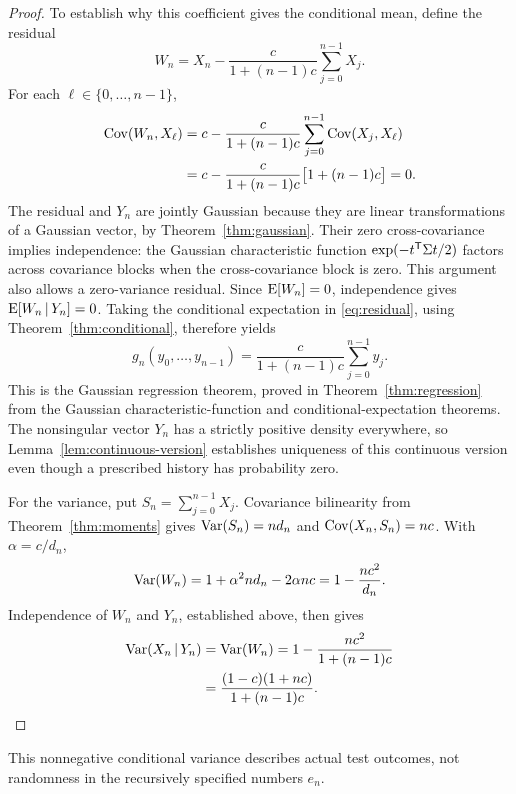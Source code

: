 \begin{proof}
To establish why this coefficient gives the conditional mean, define the
residual
\begin{equation}
  W_n=X_n-\frac{c}{1+(n-1)c}\sum_{j=0}^{n-1}X_j.
  \label{eq:residual}
\end{equation}
For each \(\ell\in\{0,\ldots,n-1\}\),
\begin{align*}
  \operatorname{Cov}(W_n,X_\ell)
  &=c-\frac{c}{1+(n-1)c}
         \sum_{j=0}^{n-1}\operatorname{Cov}(X_j,X_\ell)\\
  &=c-\frac{c}{1+(n-1)c}\bigl[1+(n-1)c\bigr]=0.
\end{align*}
The residual and \(Y_n\) are jointly Gaussian because they are linear
transformations of a Gaussian vector, by Theorem~\ref{thm:gaussian}.
Their zero cross-covariance implies
independence: the Gaussian characteristic function
\(\exp(-t^{\mathsf{T}}\Sigma t/2)\) factors across covariance blocks when the
cross-covariance block is zero. This argument also allows a zero-variance
residual. Since \(\operatorname{E}[W_n]=0\), independence gives
\(\operatorname{E}[W_n\,\vert\, Y_n]=0\). Taking the conditional expectation in
\eqref{eq:residual}, using Theorem~\ref{thm:conditional}, therefore yields
\begin{equation}
  \boxed{
    g_n(y_0,\ldots,y_{n-1})
    =\frac{c}{1+(n-1)c}\sum_{j=0}^{n-1}y_j.}
  \label{eq:conditional-mean}
\end{equation}
This is the Gaussian regression theorem, proved in
Theorem~\ref{thm:regression} from the Gaussian characteristic-function
and conditional-expectation theorems. The nonsingular vector \(Y_n\) has
a strictly positive density everywhere, so Lemma~\ref{lem:continuous-version}
establishes uniqueness of this continuous version even though a prescribed
history has probability zero.

For the variance, put \(S_n=\sum_{j=0}^{n-1}X_j\). Covariance bilinearity
from Theorem~\ref{thm:moments} gives
\(\operatorname{Var}(S_n)=nd_n\) and \(\operatorname{Cov}(X_n,S_n)=nc\). With \(\alpha=c/d_n\),
\[
 \operatorname{Var}(W_n)=1+\alpha^2nd_n-2\alpha nc=1-\frac{nc^2}{d_n}.
\]
Independence of \(W_n\) and \(Y_n\), established above, then gives
\begin{align}
  \operatorname{Var}(X_n\,\vert\, Y_n)
    &=\operatorname{Var}(W_n)
      =1-\frac{nc^2}{1+(n-1)c}\notag\\
    &=\frac{(1-c)(1+nc)}{1+(n-1)c}.
    \label{eq:conditional-variance}
\end{align}
\end{proof}
This nonnegative conditional variance describes actual test outcomes,
not randomness in the recursively specified numbers \(e_n\).

